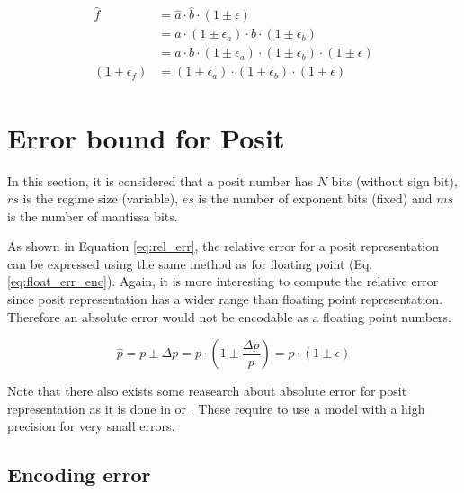 \begin{align}
\begin{split}
\hat{f} &= \hat{a} \cdot \hat{b} \cdot (1 \pm \epsilon)\\
		&= a \cdot (1 \pm \epsilon_a) \cdot b \cdot (1 \pm \epsilon_b)\\
		&= a \cdot b \cdot (1 \pm \epsilon_a) \cdot (1 \pm \epsilon_b) \cdot (1 \pm \epsilon)\\
(1 \pm \epsilon_f) &= (1 \pm \epsilon_a) \cdot (1 \pm \epsilon_b) \cdot (1 \pm \epsilon)
\end{split}
\label{eq:float_mult_err}
\end{align}

\section{Error bound for Posit}
In this section, it is considered that a posit number has $N$ bits (without sign bit), $rs$ is the regime size (variable), $es$ is the number of exponent bits (fixed) and $ms$ is the number of mantissa bits.

As shown in Equation \ref{eq:rel_err}, the relative error for a posit representation can be expressed using the same method as for floating point (Eq. \ref{eq:float_err_enc}). Again, it is more interesting to compute the relative error since posit representation has a wider range than floating point representation. Therefore an absolute error would not be encodable as a floating point numbers.

\begin{equation}
	\hat{p} = p \pm \Delta p = p \cdot \left(1 \pm \frac{\Delta p}{p}\right) = p \cdot (1 \pm \epsilon)
	\label{eq:rel_err}
\end{equation}

Note that there also exists some reasearch about absolute error for posit representation as it is done in \cite{posit_arithmetic} or \cite{bfp}. These require to use a model with a high precision for very small errors.

\subsection{Encoding error}

